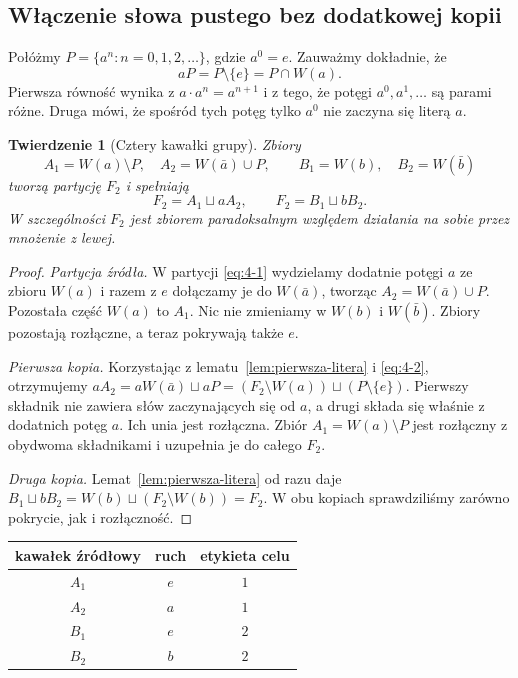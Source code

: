 \documentclass[11pt,a4paper]{article}
\numberwithin{equation}{section}
\theoremstyle{plain}
\newtheorem{twierdzenie}{Twierdzenie}[section]
\theoremstyle{definition}
\theoremstyle{remark}
\begin{document}
\subsection{Włączenie słowa pustego bez dodatkowej kopii}
Połóżmy $P=\{a^n:n=0,1,2,\ldots\}$, gdzie $a^0=e$. Zauważmy dokładnie, że
\begin{equation}\label{eq:4-2}
 aP=P\setminus\{e\}=P\cap W(a).
\end{equation}
Pierwsza równość wynika z $a\cdot a^n=a^{n+1}$ i z tego, że potęgi $a^0,a^1,\ldots$ są parami różne. Druga mówi, że spośród tych potęg tylko $a^0$ nie zaczyna się literą $a$.
\begin{twierdzenie}[Cztery kawałki grupy]\label{tw:cztery-kawalki}
Zbiory
\begin{equation}\label{eq:4-3}
 A_1=W(a)\setminus P,\quad A_2=W(\bar a)\cup P,
 \qquad B_1=W(b),\quad B_2=W(\bar b)
\end{equation}
tworzą partycję $F_2$ i spełniają
\begin{equation}\label{eq:4-4}
 F_2=A_1\sqcup aA_2,\qquad F_2=B_1\sqcup bB_2.
\end{equation}
W szczególności $F_2$ jest zbiorem paradoksalnym względem działania na sobie przez mnożenie z lewej.
\end{twierdzenie}
\begin{proof}
\emph{Partycja źródła.} W partycji \eqref{eq:4-1} wydzielamy dodatnie potęgi $a$ ze zbioru $W(a)$ i razem z $e$ dołączamy je do $W(\bar a)$, tworząc $A_2=W(\bar a)\cup P$. Pozostała część $W(a)$ to $A_1$. Nic nie zmieniamy w $W(b)$ i $W(\bar b)$. Zbiory pozostają rozłączne, a teraz pokrywają także $e$.

\emph{Pierwsza kopia.} Korzystając z lematu~\ref{lem:pierwsza-litera} i \eqref{eq:4-2}, otrzymujemy $aA_2=aW(\bar a)\sqcup aP=(F_2\setminus W(a))\sqcup(P\setminus\{e\})$. Pierwszy składnik nie zawiera słów zaczynających się od $a$, a drugi składa się właśnie z dodatnich potęg $a$. Ich unia jest rozłączna. Zbiór $A_1=W(a)\setminus P$ jest rozłączny z obydwoma składnikami i uzupełnia je do całego $F_2$.

\emph{Druga kopia.} Lemat~\ref{lem:pierwsza-litera} od razu daje $B_1\sqcup bB_2=W(b)\sqcup(F_2\setminus W(b))=F_2$. W obu kopiach sprawdziliśmy zarówno pokrycie, jak i rozłączność.
\end{proof}
\begin{center}
\begin{tabular}{c|c|c}
 kawałek źródłowy&ruch&etykieta celu\\\hline
 $A_1$&$e$&$1$\\ $A_2$&$a$&$1$\\ $B_1$&$e$&$2$\\ $B_2$&$b$&$2$
\end{tabular}
\end{center}
\end{document}
